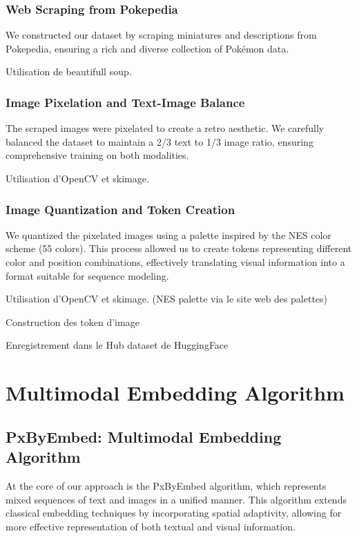 \documentclass[10pt,a4paper]{article}
\begin{document}
\subsubsection{Web Scraping from Pokepedia}
We constructed our dataset by scraping miniatures and descriptions from Pokepedia, ensuring a rich and diverse collection of Pokémon data.

Utilisation de beautifull soup. 

\subsubsection{Image Pixelation and Text-Image Balance}
The scraped images were pixelated to create a retro aesthetic. We carefully balanced the dataset to maintain a 2/3 text to 1/3 image ratio, ensuring comprehensive training on both modalities.

Utilisation d'OpenCV et skimage. 

\subsubsection{Image Quantization and Token Creation}
We quantized the pixelated images using a palette inspired by the NES color scheme (55 colors). This process allowed us to create tokens representing different color and position combinations, effectively translating visual information into a format suitable for sequence modeling.

Utilisation d'OpenCV et skimage. (NES palette via le site web des palettes)

Construction des token d'image 

Enregistrement dans le Hub dataset de HuggingFace

\section{Multimodal Embedding Algorithm}

\subsection{PxByEmbed: Multimodal Embedding Algorithm}
At the core of our approach is the PxByEmbed algorithm, which represents mixed sequences of text and images in a unified manner. This algorithm extends classical embedding techniques by incorporating spatial adaptivity, allowing for more effective representation of both textual and visual information.
\end{document}

